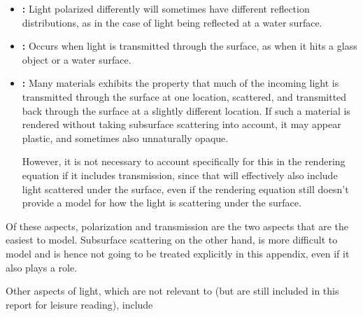 \begin{itemize}
\item \textbf{:} Light polarized differently will sometimes have different reflection distributions, as in the case of light being reflected at a water surface.

\item \textbf{:} Occurs when light is transmitted through the surface, as when it hits a glass object or a water surface.

\item \textbf{:} Many materials exhibits the property that much of the incoming light is transmitted through the surface at one location, scattered, and transmitted back through the surface at a slightly different location. If such a material is rendered without taking subsurface scattering into account, it may appear plastic, and sometimes also unnaturally opaque.

However, it is not necessary to account specifically for this in the rendering equation if it includes transmission, since that will effectively also include light scattered under the surface, even if the rendering equation still doesn't provide a model for how the light is scattering under the surface.
\end{itemize}

Of these aspects, polarization and transmission are the two aspects that are the easiest to model. Subsurface scattering on the other hand, is more difficult to model and is hence not going to be treated explicitly in this appendix, even if it also plays a role.

Other aspects of light, which are not relevant to \surfacewaterrendering (but are still included in this report for leisure reading), include

